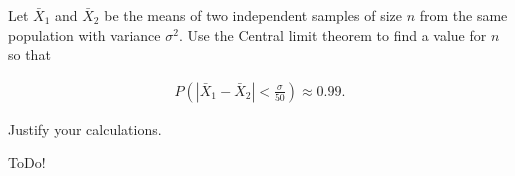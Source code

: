 
\begin{exercise}

Let $\bar X_1$ and $\bar X_2$ be the means of two independent samples of size $n$ from the same population with variance $\sigma^2$.
Use the Central limit theorem to find a value for $n$ so that

\begin{align*}
    P(|\bar X_1 - \bar X_2| < \frac{\sigma}{50}) \approx 0.99.
\end{align*}

Justify your calculations.

\end{exercise}


\begin{solution}

ToDo!

\end{solution}

